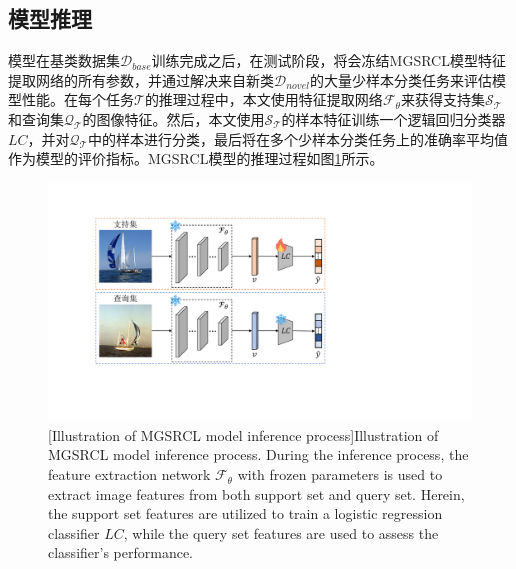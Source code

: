 \subsection[\hspace{-2pt}模型推理]{{\heiti{} \hspace{-8pt}模型推理}}\label{section3: 模型推理}
模型在基类数据集$\mathcal{D}_{base}$训练完成之后，在测试阶段，将会冻结MGSRCL模型特征提取网络的所有参数，并通过解决来自新类$\mathcal{D}_{novel}$的大量少样本分类任务来评估模型性能。在每个任务$\mathcal{T}$的推理过程中，本文使用特征提取网络$\mathcal{F}_{\theta}$来获得支持集$\mathcal{S}_\mathcal{T}$和查询集$\mathcal{Q}_\mathcal{T}$的图像特征。然后，本文使用$\mathcal{S}_\mathcal{T}$的样本特征训练一个逻辑回归分类器$LC$，并对$\mathcal{Q}_\mathcal{T}$中的样本进行分类，最后将在多个少样本分类任务上的准确率平均值作为模型的评价指标。MGSRCL模型的推理过程如图\ref{figure3: 推理过程}所示。

\begin{figure}[h]
\centering
{}
\includegraphics[width=0.8\columnwidth]{figures/MGSRCL/推理过程.pdf}
[Illustration of MGSRCL model inference process]{Illustration of MGSRCL model inference process. During the inference process, the feature extraction network $\mathcal{F}_{\theta}$ with frozen parameters is used to extract image features from both support set and query set. Herein, the support set features are utilized to train a logistic regression classifier $LC$, while the query set features are used to assess the classifier's performance.}
\vspace{-10pt}
\label{figure3: 推理过程}
\end{figure}

